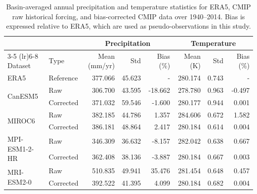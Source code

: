 
\begin{table}[htbp]
\centering
\caption[Bias-correction results]{Basin-averaged annual precipitation and temperature statistics for ERA5, CMIP raw historical forcing, and bias-corrected CMIP data over 1940--2014. Bias is expressed relative to ERA5, which are used as pseudo-observations in this study.}
\label{tab:climate_stats_1940_2014_combined_v2}
\begin{tabular}{llrrrrrr}
\toprule
 &  & \multicolumn{3}{c}{Precipitation} & \multicolumn{3}{c}{Temperature} \\
\cmidrule(lr){3-5} \cmidrule(lr){6-8}
Dataset & Type & Mean (mm/yr) & Std & Bias (\%) & Mean (K) & Std & Bias (\%) \\
\midrule
ERA5 & Reference & 377.066 & 45.623 & - & 280.174 & 0.743 & - \\
\midrule
\multirow{2}{*}{CanESM5} & Raw & 306.700 & 43.595 & -18.662 & 278.780 & 0.963 & -0.497 \\
 & Corrected & 371.032 & 59.546 & -1.600 & 280.177 & 0.944 & 0.001 \\
\midrule
\multirow{2}{*}{MIROC6} & Raw & 382.185 & 44.786 & 1.357 & 284.606 & 0.672 & 1.582 \\
 & Corrected & 386.181 & 48.864 & 2.417 & 280.184 & 0.614 & 0.004 \\
\midrule
\multirow{2}{*}{MPI-ESM1-2-HR} & Raw & 346.309 & 36.632 & -8.157 & 282.042 & 0.638 & 0.667 \\
 & Corrected & 362.408 & 38.136 & -3.887 & 280.184 & 0.667 & 0.003 \\
\midrule
\multirow{2}{*}{MRI-ESM2-0} & Raw & 510.835 & 49.941 & 35.476 & 281.454 & 0.648 & 0.457 \\
 & Corrected & 392.522 & 41.395 & 4.099 & 280.184 & 0.682 & 0.004 \\
\bottomrule
\end{tabular}
\end{table}
